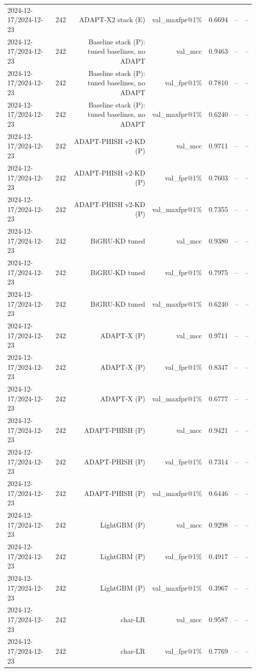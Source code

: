 \begin{table}[t]
\begin{tabular}{llrrrrr}
2024-12-17/2024-12-23 & 242 & ADAPT-X2 stack (E) & val\_maxfpr@1\% & 0.6694 & -- & -- \\
2024-12-17/2024-12-23 & 242 & Baseline stack (P): tuned baselines, no ADAPT & val\_mcc & 0.9463 & -- & -- \\
2024-12-17/2024-12-23 & 242 & Baseline stack (P): tuned baselines, no ADAPT & val\_fpr@1\% & 0.7810 & -- & -- \\
2024-12-17/2024-12-23 & 242 & Baseline stack (P): tuned baselines, no ADAPT & val\_maxfpr@1\% & 0.6240 & -- & -- \\
2024-12-17/2024-12-23 & 242 & ADAPT-PHISH v2-KD (P) & val\_mcc & 0.9711 & -- & -- \\
2024-12-17/2024-12-23 & 242 & ADAPT-PHISH v2-KD (P) & val\_fpr@1\% & 0.7603 & -- & -- \\
2024-12-17/2024-12-23 & 242 & ADAPT-PHISH v2-KD (P) & val\_maxfpr@1\% & 0.7355 & -- & -- \\
2024-12-17/2024-12-23 & 242 & BiGRU-KD tuned & val\_mcc & 0.9380 & -- & -- \\
2024-12-17/2024-12-23 & 242 & BiGRU-KD tuned & val\_fpr@1\% & 0.7975 & -- & -- \\
2024-12-17/2024-12-23 & 242 & BiGRU-KD tuned & val\_maxfpr@1\% & 0.6240 & -- & -- \\
2024-12-17/2024-12-23 & 242 & ADAPT-X (P) & val\_mcc & 0.9711 & -- & -- \\
2024-12-17/2024-12-23 & 242 & ADAPT-X (P) & val\_fpr@1\% & 0.8347 & -- & -- \\
2024-12-17/2024-12-23 & 242 & ADAPT-X (P) & val\_maxfpr@1\% & 0.6777 & -- & -- \\
2024-12-17/2024-12-23 & 242 & ADAPT-PHISH (P) & val\_mcc & 0.9421 & -- & -- \\
2024-12-17/2024-12-23 & 242 & ADAPT-PHISH (P) & val\_fpr@1\% & 0.7314 & -- & -- \\
2024-12-17/2024-12-23 & 242 & ADAPT-PHISH (P) & val\_maxfpr@1\% & 0.6446 & -- & -- \\
2024-12-17/2024-12-23 & 242 & LightGBM (P) & val\_mcc & 0.9298 & -- & -- \\
2024-12-17/2024-12-23 & 242 & LightGBM (P) & val\_fpr@1\% & 0.4917 & -- & -- \\
2024-12-17/2024-12-23 & 242 & LightGBM (P) & val\_maxfpr@1\% & 0.3967 & -- & -- \\
2024-12-17/2024-12-23 & 242 & char-LR & val\_mcc & 0.9587 & -- & -- \\
2024-12-17/2024-12-23 & 242 & char-LR & val\_fpr@1\% & 0.7769 & -- & -- \\

\end{tabular}
\end{table}
